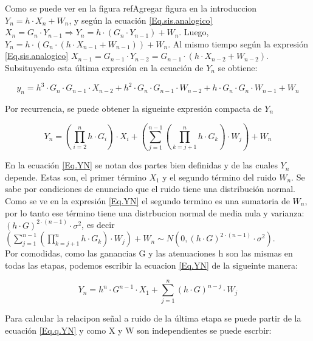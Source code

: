 \indent Como se puede ver en la figura ref{Agregar figura en la introduccion} $Y_n = h \cdot X_n + W_n $, y según la ecuación \ref{Eq.sis.analogico}  $ X_n = G_n \cdot Y_{n-1} \Rightarrow Y_n = h \cdot (G_n \cdot Y_{n-1})+ W_n$. Luego,  $Y_n = h \cdot (G_n \cdot (h \cdot X_{n-1} + W_{n-1})) + W_n $. Al mismo tiempo según la expresión \ref{Eq.sis.analogico} $X_{n-1} = G_{n-1} \cdot Y_{n-2} = G_{n-1} \cdot (h \cdot X_{n-2} + W_{n-2})$. Subsituyendo esta última expresión en la ecuación de $Y_n$ se obtiene:

		\begin{equation}
			y_n = h^3 \cdot G_n \cdot G_{n-1} \cdot X_{n-2} + h^2 \cdot G_n \cdot G_{n-1} \cdot W_{n-2} + h \cdot G_n \cdot G_n \cdot W_{n-1} + W_n
			\label{Eq.yn}			
		\end{equation}

\indent Por recurrencia, se puede obtener la sigueinte expresión compacta de $Y_n$

		\begin{equation}
				Y_n = \left(\prod_{i=2}^{n}{h \cdot G_i} \right) \cdot X_i + \left( \sum_{j=1}^{n-1} \left( \prod_{k=j+1}^{n} h \cdot G_k \right) \cdot W_j \right) + W_n
				\label{Eq.YN}
		\end{equation}
		
\indent En la ecuación \ref{Eq.YN} se notan dos partes bien definidas y de las cuales $Y_n$ depende. Estas son, el primer término $X_1$ y el segundo término del ruido $W_n$. Se sabe por condiciones de enunciado que el ruido tiene una distribución normal. Como se ve en la expresión \ref{Eq.YN} el segundo termino es una sumatoria de $W_n$, por lo tanto ese término tiene una distrbucion normal de media nula y varianza: $\left( h \cdot G \right)^{2 \cdot (n-1)} \cdot \sigma ^2$, es decir $\left( \sum_{j=1}^{n-1} \left( \prod_{k=j+1}^{n} h \cdot G_k \right) \cdot W_j \right) + W_n \sim N (0, \left( h \cdot G \right)^{2 \cdot (n-1)} \cdot \sigma ^2)$.\\

\indent Por comodidas, como las ganancias G y las atenuaciones h son las mismas en todas las etapas, podemos escribir la ecuacion \ref{Eq.YN} de la sigueinte manera:

			\begin{equation}
				Y_n = h^n \cdot G^{n-1} \cdot X_1 + \sum_{j=1}^{n} \left( h \cdot G \right)^{n-j} \cdot W_j
				\label{Eq.Yreducida}
			\end{equation}

\indent Para calcular la relacipon señal a ruido de la última etapa se puede partir de la ecuación \ref{Eq.q.YN} y como X y W son independientes se puede escrbir:


